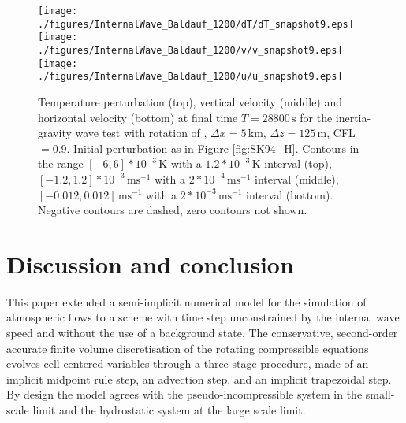 \documentclass{ametsoc}
\theoremstyle{definition}
\begin{document}
\begin{figure}
\centering
 \texttt{[image: ./figures/InternalWave\_Baldauf\_1200/dT/dT\_snapshot9.eps]}
 \texttt{[image: ./figures/InternalWave\_Baldauf\_1200/v/v\_snapshot9.eps]}
 \texttt{[image: ./figures/InternalWave\_Baldauf\_1200/u/u\_snapshot9.eps]}
 \caption{Temperature perturbation (top), vertical velocity (middle) and horizontal velocity (bottom) at final time $T=28800\,\textrm{s}$ for the inertia-gravity wave test with rotation of \cite{BaldaufBrdar2013}, $\Delta x=5\,\textrm{km},\,\Delta z=125\,\textrm{m}$, CFL$=0.9$. Initial perturbation as in Figure \ref{fig:SK94_H}. Contours in the range $[-6, 6]*10^{-3}\,\textrm{K}$ with a $1.2*10^{-3}\,\textrm{K}$ interval (top), $[-1.2, 1.2]*10^{-3}\,\textrm{ms$^{-1}$}$  with a $2*10^{-4}\,\textrm{ms$^{-1}$}$ interval (middle), $[-0.012, 0.012]\,\textrm{ms$^{-1}$}$ with a $2*10^{-3}\,\textrm{ms$^{-1}$}$ interval (bottom). Negative contours are dashed, zero contours not shown.}
  \label{fig:BB13}
\end{figure}


\section{Discussion and conclusion}
\label{sec:Conclusions}	

This paper extended a semi-implicit numerical model for the simulation of atmospheric flows to a scheme with time step unconstrained by the internal wave speed and without the use of a background state. The conservative, second-order accurate finite volume discretisation of the rotating compressible equations evolves cell-centered variables through a three-stage procedure, made of an implicit midpoint rule step, an advection step, and an implicit trapezoidal step. By design the model agrees with the pseudo-incompressible system in the small-scale limit and the hydrostatic system at the large scale limit.
\end{document}
